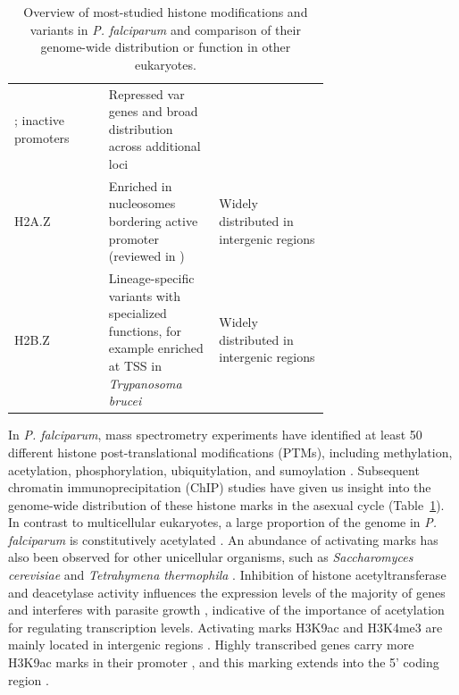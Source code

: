 {\begin{table}
\begin{center}
\begin{tabular}{lp{0.35\linewidth}p{0.35\linewidth}}
{\citep{barski:high-resolution, lachner:trilogies}};
inactive promoters {\small \citep{wang:combinatorial}} &
Repressed var genes {\small \citep{jiang:pfsetvs}} and broad distribution
across additional loci {\small \citep{lopez-rubio:genome-wide}} \\
H2A.Z &
Enriched in nucleosomes bordering active promoter (reviewed in
{\small \citep{zlatanova:h2az, talbert:histone}})
& Widely distributed in intergenic regions {\small \citep{hoeijmakers:h2az,
petter:h2az}} \\
H2B.Z &
Lineage-specific variants with specialized functions, for example enriched at
TSS in \textit{Trypanosoma brucei} {\small \citep{siegel:four}} &
Widely distributed in intergenic regions {\small \citep{hoeijmakers:h2az,
petter:h2az}} \\
\end{tabular}
\end{center}
\caption{Overview of most-studied histone modifications and variants in
\textit{P. falciparum} and comparison of their genome-wide distribution or
function in other eukaryotes.}
\label{table:histone_mod}
\end{table}}

In \textit{P. falciparum}, mass spectrometry experiments have identified at
least 50 different histone post-translational modifications (PTMs), including
methylation, acetylation, phosphorylation, ubiquitylation, and sumoylation
\citep{lasonder:insights, miao:malaria, treeck:phosphoproteomes,
trelle:global}. Subsequent chromatin immunoprecipitation (ChIP) studies have
given us insight into the genome-wide distribution of these histone marks in
the asexual cycle (Table~\ref{table:histone_mod}). In contrast to multicellular eukaryotes, a large
proportion of the genome in \textit{P. falciparum} is constitutively
acetylated \citep{miao:malaria, lopez-rubio:genome-wide}. An abundance of
activating marks has also been observed for other unicellular organisms, such
as \textit{Saccharomyces cerevisiae} and \textit{Tetrahymena thermophila}
\citep{garcia:organismal}. Inhibition of
histone acetyltransferase and deacetylase activity influences the expression
levels of the majority of genes and interferes with parasite growth
\citep{cui:histone, cui:cytotoxic, chaal:histone},
indicative of the importance of acetylation for regulating transcription
levels. Activating marks H3K9ac and H3K4me3 are mainly located in intergenic
regions \citep{bartfai:h2az, jiang:pfsetvs, salcedo-amaya:dynamic}.
Highly transcribed genes carry more H3K9ac marks in their
promoter \citep{bartfai:h2az}, 
and this marking extends into the 5’ coding region
\citep{salcedo-amaya:dynamic}.

